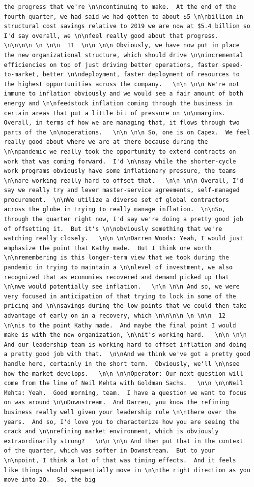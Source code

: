 \documentclass[
  letterpaper,
  DIV=11,
  numbers=noendperiod]{scrreprt}
\begin{document}
\begin{verbatim}
the progress that we're \n\ncontinuing to make.  At the end of the fourth quarter, we had said we had gotten to about $5 \n\nbillion in structural cost savings relative to 2019 we are now at $5.4 billion so I'd say overall, we \n\nfeel really good about that progress.   \n\n\n\n \n \n\n  11  \n\n \n\n Obviously, we have now put in place the new organizational structure, which should drive \n\nincremental efficiencies on top of just driving better operations, faster speed-to-market, better \n\ndeployment, faster deployment of resources to the highest opportunities across the company.   \n\n \n\n We're not immune to inflation obviously and we would see a fair amount of both energy and \n\nfeedstock inflation coming through the business in certain areas that put a little bit of pressure on \n\nmargins.  Overall, in terms of how we are managing that, it flows through two parts of the \n\noperations.   \n\n \n\n So, one is on Capex.  We feel really good about where we are at there because during the \n\npandemic we really took the opportunity to extend contracts on work that was coming forward.  I'd \n\nsay while the shorter-cycle work programs obviously have some inflationary pressure, the teams \n\nare working really hard to offset that.   \n\n \n\n Overall, I'd say we really try and lever master-service agreements, self-managed procurement.  \n\nWe utilize a diverse set of global contractors across the globe in trying to really manage inflation.  \n\nSo, through the quarter right now, I'd say we're doing a pretty good job of offsetting it.  But it's \n\nobviously something that we're watching really closely.   \n\n \n\nDarren Woods: Yeah, I would just emphasize the point that Kathy made.  But I think one worth \n\nremembering is this longer-term view that we took during the pandemic in trying to maintain a \n\nlevel of investment, we also recognized that as economies recovered and demand picked up that \n\nwe would potentially see inflation.   \n\n \n\n And so, we were very focused in anticipation of that trying to lock in some of the pricing and \n\nsavings during the low points that we could then take advantage of early on in a recovery, which \n\n\n\n \n \n\n  12  \n\nis to the point Kathy made.  And maybe the final point I would make is with the new organization, \n\nit's working hard.   \n\n \n\n And our leadership team is working hard to offset inflation and doing a pretty good job with that.  \n\nAnd we think we've got a pretty good handle here, certainly in the short term.  Obviously, we'll \n\nsee how the market develops.   \n\n \n\nOperator: Our next question will come from the line of Neil Mehta with Goldman Sachs.   \n\n \n\nNeil Mehta: Yeah.  Good morning, team.  I have a question we want to focus on was around \n\nDownstream.  And Darren, you know the refining business really well given your leadership role \n\nthere over the years.  And so, I'd love you to characterize how you are seeing the crack and \n\nrefining market environment, which is obviously extraordinarily strong?   \n\n \n\n And then put that in the context of the quarter, which was softer in Downstream.  But to your \n\npoint, I think a lot of that was timing effects.  And it feels like things should sequentially move in \n\nthe right direction as you move into 2Q.  So, the big 
\end{verbatim}
\end{document}
